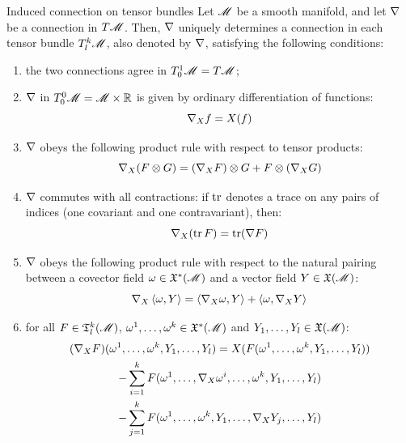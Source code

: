 \begin{proposition}{Induced connection on tensor bundles}{}
  Let $ \mathscr{M} $ be a smooth manifold, and let $ \nabla $ be a connection in $ T\mathscr{M} $. Then, $ \nabla $ uniquely determines a connection in each tensor bundle $ T^k_l\mathscr{M} $, also denoted by $ \nabla $, satisfying the following conditions:
  \begin{enumerate}
    \item the two connections agree in $ T^1_0\mathscr{M} = T\mathscr{M} $;
    \item $ \nabla $ in $ T^0_0 \mathscr{M} = \mathscr{M} \times \mathbb{R} $ is given by ordinary differentiation of functions:
      \begin{equation*}
        \nabla_X f = X(f)
      \end{equation*}
    \item $ \nabla $ obeys the following product rule with respect to tensor products:
      \begin{equation}
        \nabla_X (F \otimes G) = (\nabla_X F) \otimes G + F \otimes (\nabla_X G)
      \end{equation}
    \item $ \nabla $ commutes with all contractions: if $ \operatorname{tr} $ denotes a trace on any pairs of indices (one covariant and one contravariant), then:
      \begin{equation*}
        \nabla_X (\operatorname{tr} F) = \operatorname{tr} (\nabla F)
      \end{equation*}
    \item $ \nabla $ obeys the following product rule with respect to the natural pairing between a covector field $ \omega \in \mathfrak{X}^*(\mathscr{M}) $ and a vector field $ Y \in \mathfrak{X}(\mathscr{M}) $:
      \begin{equation}
        \nabla_X \braket{\omega , Y} = \braket{\nabla_X \omega , Y} + \braket{\omega , \nabla_X Y}
        \label{eq:co-covec-pairing}
      \end{equation}
    \item for all $ F \in \mathfrak{T}^{k}_{l}(\mathscr{M}) $, $ \omega^1 , \dots , \omega^k \in \mathfrak{X}^*(\mathscr{M}) $ and $ Y_1 , \dots , Y_l \in \mathfrak{X}(\mathscr{M}) $:
      \begin{multline}
        (\nabla_X F) (\omega^1 , \dots , \omega^k , Y_1 , \dots , Y_l) = X(F(\omega^1 , \dots , \omega^k , Y_1 , \dots , Y_l)) \\
        - \sum_{i = 1}^{k} F(\omega^1 , \dots , \nabla_X \omega^i , \dots , \omega^k , Y_1 , \dots , Y_l) \\
        - \sum_{j = 1}^{k} F(\omega^1 , \dots , \omega^k , Y_1 , \dots , \nabla_X Y_j , \dots , Y_l)
      \end{multline}
  \end{enumerate}
\end{proposition}

